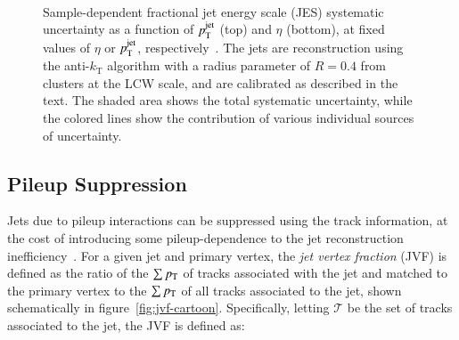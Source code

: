 \begin{figure}[htbp]
{	}
	\hfill
	 \\
	\caption[Sample-dependent fractional jet energy scale (JES) systematic uncertainty as a function of $\pt^{\mathrm{jet}}$ (top) and $\eta$ (bottom), at fixed values of $\eta$ or $\pt^{\mathrm{jet}}$, respectively. The jets are reconstruction using the anti-$k_{\mathrm{T}}$ algorithm with a radius parameter of $R=0.4$ from clusters at the LCW scale, and are calibrated as described in the text. The shaded area shows the total systematic uncertainty, while the colored lines show the contribution of various individual sources of uncertainty.]{Sample-dependent fractional jet energy scale (JES) systematic uncertainty as a function of $\pt^{\mathrm{jet}}$ (top) and $\eta$ (bottom), at fixed values of $\eta$ or $\pt^{\mathrm{jet}}$, respectively~\cite{TheATLASCollaboration:2015ds}. The jets are reconstruction using the anti-$k_{\mathrm{T}}$ algorithm with a radius parameter of $R=0.4$ from clusters at the LCW scale, and are calibrated as described in the text. The shaded area shows the total systematic uncertainty, while the colored lines show the contribution of various individual sources of uncertainty.}
	\label{fig:reco-jes-uncertainty}
\end{figure}

\subsection{Pileup Suppression}\label{sec:reco-jets-jvf}
Jets due to pileup interactions can be suppressed using the track information, at the cost of introducing some pileup-dependence to the jet reconstruction inefficiency~\cite{TheATLASCollaboration:2013vb}. For a given jet and primary vertex, the \emph{jet vertex fraction} (JVF) is defined as the ratio of the $\sum p_{\text{T}}$ of tracks associated with the jet and matched to the primary vertex to the $\sum p_{\text{T}}$ of all tracks associated to the jet, shown schematically in figure~\ref{fig:jvf-cartoon}. Specifically, letting $\mathcal{T}$ be the set of tracks associated to the jet, the JVF is defined as:


